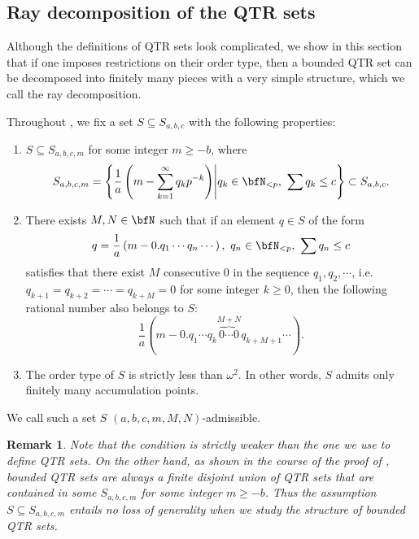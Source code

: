 \documentclass[english,oneside]{smfart}
\newtheorem{remark}[theorem]{Remark}
\begin{document}
\subsection{Ray decomposition of the QTR sets}\label{sec:23337}
Although the definitions of QTR sets look complicated, we show in this section that if one imposes restrictions on their order type, then a bounded QTR set can be decomposed into finitely many pieces with a very simple structure, which we call the ray decomposition.

Throughout , we fix a set $S\subseteq S_{a,b,c}$ with the following properties:
\begin{enumerate}[label=(S\arabic*),ref=\textup{S\arabic*}]
    \item\label{it:65165} %
          $S\subseteq S_{a,b,c,m}$ for some integer $m\geq -b$, where
$$S_{a,b,c,m}=\left\{\frac{1}{a}\left(m-\sum_{k=1}^\infty q_kp^{-k}\right)\middle\vert q_k\in \bfN_{<p},\ \sum q_k\leq c\right\}\subset S_{a,b,c}.$$
    \item\label{it:49436} There exists $M,N\in \bfN$ such that if an element $q\in S$ of the form
          $$q=\frac{1}{a}\left(m-0.q_1\cdots q_n\cdots\right),\ q_n\in\bfN_{<p},\ \sum q_n\leq c$$
          satisfies that there exist $M$ consecutive $0$ in the sequence $q_1,q_2,\cdots$, i.e. $q_{k+1}=q_{k+2}=\cdots=q_{k+M}=0$ for some integer $k\geq 0$, then the following rational number also belongs to $S$:
          $$\frac{1}{a}\left(m-0.q_1\cdots q_k\overbrace{0\cdots0}^{M+N}q_{k+M+1}\cdots\right).$$
    \item\label{it:31201} The order type of $S$ is strictly less than $\omega^2$. In other words, $S$ admits only finitely many accumulation points.
\end{enumerate}
We call such a set $S$ $(a,b,c,m,M,N)$-admissible.

\begin{remark}
    Note that the condition  is strictly weaker than the one we use to define QTR sets. On the other hand, as shown in the course of the proof of , bounded QTR sets are always a finite disjoint union of QTR sets that are contained in some $S_{a,b,c,m}$ for some integer $m\geq -b$. Thus the assumption $S\subseteq S_{a,b,c,m}$ entails no loss of generality when we study the structure of bounded QTR sets.
\end{remark}
\end{document}
